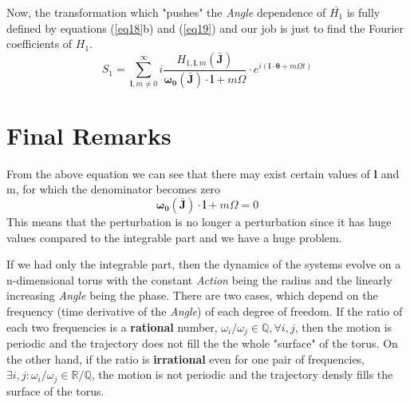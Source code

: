 Now, the transformation which "pushes" the \textit{Angle} dependence of $\bar{H_1}$ is fully defined by equations (\ref{eq18}b) and (\ref{eq19}) and our job is just to find the Fourier coefficients of $H_1$.
	\begin{equation}\label{eq20}
		S_1 = \sum_{\bm{l},m\neq0}^\infty i\frac{H_{1,\bm{l},m}(\bar{\bm{J}})}{\bm{\omega_0}(\bm{\bar{J}})\cdot \bm{l} + m\Omega} \cdot e^{i(\bm{l}\cdot\bm{\theta}+m\Omega t)} 
	\end{equation}

\section{Final Remarks}
From the above equation we can see that there may exist certain values of $\bm{l}$ and m, for which the denominator becomes zero
	\begin{equation}\label{eq21}
		\bm{\omega_0}(\bm{\bar{J}})\cdot \bm{l} + m\Omega = 0
	\end{equation}
This means that the perturbation is no longer a perturbation since it has huge values compared to the integrable part and we have a huge problem.  

If we had only the integrable part, then the dynamics of the systems evolve on a n-dimensional torus with the constant \textit{Action} being the radius and the linearly increasing \textit{Angle} being the phase. 
	There are two cases, which depend on the frequency (time derivative of the \textit{Angle}) of each degree of freedom. If the ratio of each two frequencies is a \textbf{rational} number, $\omega_i/\omega_j \in\mathbb{Q},\forall i,j$, then the motion is periodic and the trajectory does not fill the the whole "surface" of the torus. 
	On the other hand, if the ratio is \textbf{irrational} even for one pair of frequencies, $\exists i,j: \omega_i/\omega_j\in\mathbb{R}/\mathbb{Q}$, the motion is not periodic and the trajectory densly fills the surface of the torus.
	
